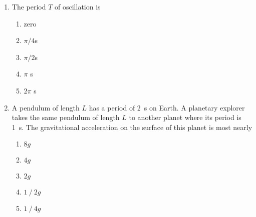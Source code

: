 \documentclass{../../oss-apphys}
\begin{document}
\begin{multicols}{2}
\begin{enumerate}[leftmargin=18pt,resume]
  \item The period $T$ of oscillation is
    \begin{enumerate}[noitemsep,topsep=0pt,leftmargin=18pt,label=(\Alph*)]
    \item zero
    \item $\pi/4$\si{\second}
    \item $\pi/2$\si{\second}
    \item $\pi$  \si{\second}
    \item $2\pi$ \si{\second}
    \end{enumerate}

    \columnbreak
    
  \item A pendulum of length $L$ has a period of \SI{2}{\second} on Earth. A
    planetary explorer takes the same pendulum of length $L$ to another planet
    where its period is \SI{1}{\second}. The gravitational acceleration on the
    surface of this planet is most nearly
    \begin{enumerate}[noitemsep,topsep=0pt]
    \item $8 g$
    \item $4 g$
    \item $2 g$
    \item $1⁄2 g$
    \item $1⁄4 g$
    \end{enumerate}


\end{enumerate}
\end{multicols}
\end{document}

